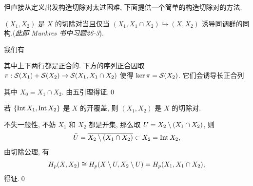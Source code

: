 但直接从定义出发构造切除对太过困难, 下面提供一个简单的构造切除对的方法.

\begin{Lemma}
	$ (X_1,X_2) $ 是 $ X $ 的切除对当且仅当 $ (X_1,X_1\cap X_2)\hookrightarrow(X,X_2) $ 诱导同调群的同构.(\textit{此即 Munkres 书中习题26-3}).
\end{Lemma}
\begin{Proof}
	我们有
	\begin{center}
	\end{center}
	其中上下两行都是正合的. 下方的序列正合因取 $ \pi : \mathcal{S}(X_1)+\mathcal{S}(X_2)\to\mathcal{S}(X_1,X_1\cap X_2) $ 使得 $ \ker\pi=\mathcal{S}(X_2) $. 它们会诱导长正合列
	\begin{center}
	\end{center}
	其中 $ X_0=X_1\cap X_2 $. 由五引理得证.\qed
\end{Proof}

\begin{Proposition}
	若 $ \left\{ \mathrm{Int}\,X_1,\mathrm{Int}\,X_2 \right\} $ 是 $ X $ 的开覆盖, 则 $ (X_1,X_2) $ 是 $ X $ 的切除对.
\end{Proposition}
\begin{Proof}
	不失一般性, 不妨 $ X_1 $ 和 $ X_2 $ 都是开集, 那么取 $ U=X_2\setminus(X_1\cap X_2) $, 则
	\[
		\bar{U}=\overline{X_2\setminus(X_1\cap X_2)}\subset X_2=\mathrm{Int}\,X_2,
	\]
	由切除公理, 有
	\[
		H_p(X,X_2)\cong H_p(X\setminus U,X_2\setminus U)=H_p(X_1,X_1\cap X_2),
	\]
	得证.\qed
\end{Proof}

